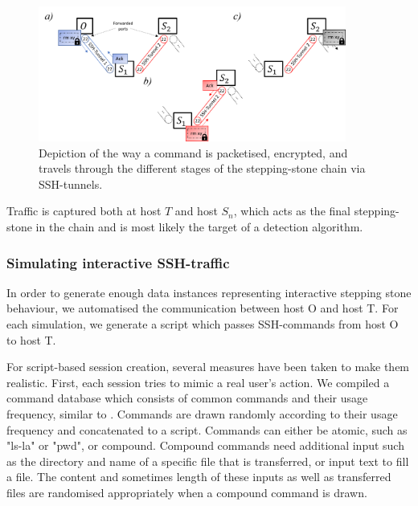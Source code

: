 \documentclass[runningheads]{llncs}\usepackage[]{graphicx}\usepackage[]{color}
\begin{document}
\begin{figure}
\centering
\includegraphics[width=0.9\textwidth]{images/Packetway.png}
\caption{Depiction of the way a command is packetised, encrypted, and travels through the different stages of the stepping-stone chain via SSH-tunnels.}\label{Fig:Packetway}
\end{figure}

Traffic is captured both at host $T$ and host $S_n$, which acts as the final stepping-stone in the chain and is most likely the target of a detection algorithm. 








\subsubsection{Simulating interactive SSH-traffic}\label{Sec:Simulating_interactive}

In order to generate enough data instances representing interactive stepping stone behaviour, we automatised the communication between host O and host T.  For each simulation, we generate a script which passes SSH-commands from host O to host T.

For script-based session creation, several measures have been taken to make them realistic. First, each session tries to mimic a real user's action. We compiled a command database which consists of common commands and their usage frequency, similar to \cite{xin2006testbed}.%
Commands are drawn randomly according to their usage frequency and concatenated to a script. 
Commands can either be atomic, such as "ls-la" or "pwd", or compound. Compound commands need additional input such as the directory and name of a specific file that is transferred, or input text to fill a file. The content and sometimes length of these inputs as well as transferred files are randomised appropriately when a compound command is drawn. 
\end{document}
